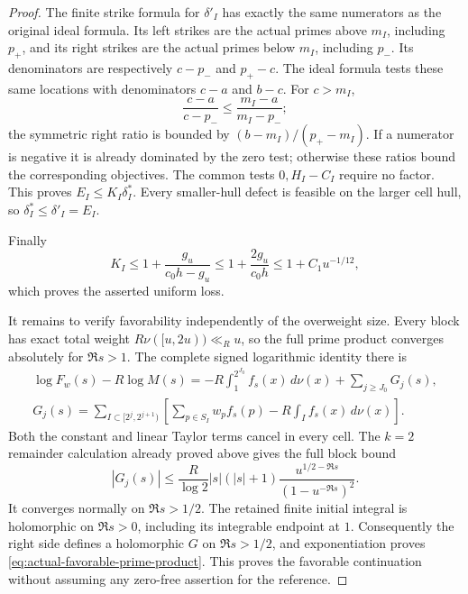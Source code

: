 \documentclass[11pt]{article}
\theoremstyle{definition}
\begin{document}
\begin{proof}
The finite strike formula for $\delta'_I$ has exactly the
same numerators as the original ideal formula. Its left
strikes are the actual primes above $m_I$, including $p_+$,
and its right strikes are the actual primes below $m_I$,
including $p_-$. Its denominators are respectively $c-p_-$
and $p_+-c$. The ideal formula tests these same locations
with denominators $c-a$ and $b-c$.
For $c>m_I$,
\[
 \frac{c-a}{c-p_-}\le\frac{m_I-a}{m_I-p_-};
\]
the symmetric right ratio is bounded by
$(b-m_I)/(p_+-m_I)$.
If a numerator is negative it is already dominated by the
zero test; otherwise these ratios bound the corresponding
objectives. The common tests $0,H_I-C_I$ require no factor.
This proves $E_I\le K_I\delta_I^*$.
Every smaller-hull defect is feasible on the larger cell
hull, so $\delta_I^*\le\delta'_I=E_I$.

Finally
\[
 K_I\le1+\frac{g_u}{c_0h-g_u}
      \le1+\frac{2g_u}{c_0h}
      \le1+C_1u^{-1/12},
\]
which proves the asserted uniform loss.

It remains to verify favorability independently of the
overweight size. Every block has exact total weight
$R\nu([u,2u))\ll_Ru$, so the full prime product converges
absolutely for $\Re s>1$.
The complete signed logarithmic identity there is
\begin{gather*}
 \log F_w(s)-R\log M(s)
 =-R\int_1^{2^{J_0}}f_s(x)\,d\nu(x)+\sum_{j\ge J_0}G_j(s),\\
 G_j(s)=\sum_{I\subset[2^j,2^{j+1})}
       \left[\sum_{p\in S_I}w_pf_s(p)
                          -R\int_I f_s(x)\,d\nu(x)\right].
\end{gather*}
Both the constant and linear Taylor terms cancel in every
cell. The $k=2$ remainder calculation already proved above
gives the full block bound
\begin{equation}
 |G_j(s)|\le
 \frac{R}{\log2}|s|(|s|+1)
              \frac{u^{1/2-\Re s}}{(1-u^{-\Re s})^2}.
 \label{eq:actual-prime-model-error}
\end{equation}
It converges normally on $\Re s>1/2$.
The retained finite initial integral is holomorphic on
$\Re s>0$, including its integrable endpoint at $1$.
Consequently the right side defines a holomorphic $G$ on
$\Re s>1/2$, and exponentiation proves
\eqref{eq:actual-favorable-prime-product}.
This proves the favorable continuation without assuming
any zero-free assertion for the reference.
\end{proof}
\end{document}
